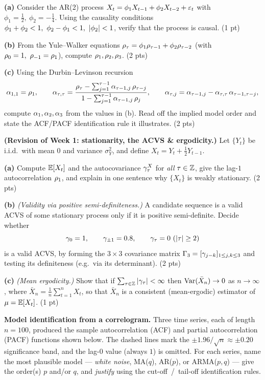 \documentclass[11pt]{article}
\begin{document}
\textbf{(a)} Consider the AR(2) process $X_t=\phi_1 X_{t-1}+\phi_2 X_{t-2}+\varepsilon_t$ with $\phi_1=\tfrac12,\ \phi_2=-\tfrac14$. Using the causality conditions $\phi_1+\phi_2<1,\ \phi_2-\phi_1<1,\ \abs{\phi_2}<1$, verify that the process is causal. \hfill(1 pt)

\textbf{(b)} From the Yule--Walker equations $\rho_\tau=\phi_1\rho_{\tau-1}+\phi_2\rho_{\tau-2}$ (with $\rho_0=1,\ \rho_{-1}=\rho_1$), compute $\rho_1,\rho_2,\rho_3$. \hfill(2 pts)

\textbf{(c)} Using the Durbin--Levinson recursion
\[
\alpha_{1,1}=\rho_1,\qquad
\alpha_{\tau,\tau}=\frac{\rho_\tau-\sum_{j=1}^{\tau-1}\alpha_{\tau-1,j}\,\rho_{\tau-j}}{1-\sum_{j=1}^{\tau-1}\alpha_{\tau-1,j}\,\rho_{j}},
\qquad
\alpha_{\tau,j}=\alpha_{\tau-1,j}-\alpha_{\tau,\tau}\,\alpha_{\tau-1,\tau-j},
\]
compute $\alpha_1,\alpha_2,\alpha_3$ from the values in (b). Read off the implied model order and state the ACF/PACF identification rule it illustrates. \hfill(2 pts)
\answerpage

\textbf{(Revision of Week 1: stationarity, the ACVS \& ergodicity.)} Let $\{Y_t\}$ be i.i.d.\ with mean $0$ and variance $\sigma_Y^2$, and define $X_t=Y_t+\tfrac12 Y_{t-1}$.

\textbf{(a)} Compute $\mathbb{E}[X_t]$ and the autocovariance $\gamma^X_\tau$ for \emph{all} $\tau\in\mathbb{Z}$, give the lag-$1$ autocorrelation $\rho_1$, and explain in one sentence why $\{X_t\}$ is weakly stationary. \hfill(2 pts)

\textbf{(b)} \emph{(Validity via positive semi-definiteness.)} A candidate sequence is a valid ACVS of some stationary process only if it is positive semi-definite. Decide whether
\[
\gamma_0=1,\qquad \gamma_{\pm1}=0.8,\qquad \gamma_\tau=0\ (\left\lvert \tau \right\rvert\ge2)
\]
is a valid ACVS, by forming the $3\times3$ covariance matrix $\Gamma_3=[\gamma_{j-k}]_{1\le j,k\le3}$ and testing its definiteness (e.g.\ via its determinant). \hfill(2 pts)

\textbf{(c)} \emph{(Mean ergodicity.)} Show that if $\sum_{\tau\in\mathbb{Z}}\left\lvert \gamma_\tau \right\rvert<\infty$ then $\operatorname{Var}(\bar X_n)\to0$ as $n\to\infty$, where $\bar X_n=\tfrac1n\sum_{t=1}^n X_t$, so that $\bar X_n$ is a consistent (mean-ergodic) estimator of $\mu=\mathbb{E}[X_t]$. \hfill(1 pt)
\answerpage

\textbf{Model identification from a correlogram.} Three time series, each of length $n=100$, produced the sample autocorrelation (ACF) and partial autocorrelation (PACF) functions shown below. The dashed lines mark the $\pm1.96/\sqrt n\approx\pm0.20$ significance band, and the lag-$0$ value (always $1$) is omitted. For each series, name the most plausible model --- \emph{white noise}, MA($q$), AR($p$), or ARMA($p,q$) --- give the order(s) $p$ and/or $q$, and \emph{justify} using the cut-off~/~tail-off identification rules.
\end{document}
